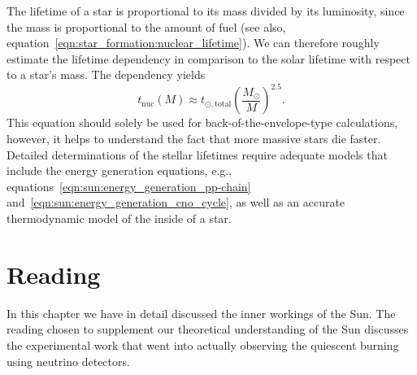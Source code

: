 The lifetime of a star is proportional to its mass divided by its luminosity, since the mass is proportional to the amount of fuel (see also, equation~\ref{eqn:star_formation:nuclear_lifetime}). We can therefore roughly estimate the lifetime dependency in comparison to the solar lifetime with respect to a star's mass. The dependency yields
\begin{equation}
    t_\mathrm{nuc}(M) \approx t_{\odot\mathrm{,total}} \left(\frac{M_\odot}{M}\right)^{2.5}. \label{eqn:sun:stellar_lifetime_estimate}
\end{equation}
This equation should solely be used for back-of-the-envelope-type calculations, however, it helps to understand the fact that more massive stars die faster. Detailed determinations of the stellar lifetimes require adequate models that include the energy generation equations, e.g., equations~\eqref{eqn:sun:energy_generation_pp-chain} and~\eqref{eqn:sun:energy_generation_cno_cycle}, as well as an accurate thermodynamic model of the inside of a star.

\section{Reading}

In this chapter we have in detail discussed the inner workings of the Sun. The reading chosen to supplement our theoretical understanding of the Sun discusses the experimental work that went into actually observing the quiescent burning using neutrino detectors.

